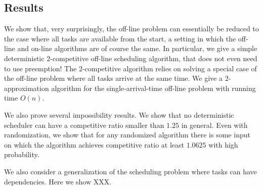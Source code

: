 \subsection{Results}
We show that, very surprisingly, the off-line problem can
essentially be reduced to the case where all tasks are available
from the start, a setting in which the off-line and on-line
algorithms are of course the same. In particular, we give a
simple deterministic $2$-competitive off-line scheduling
algorithm, that does not even need to use preemption! The
$2$-competitive algorithm relies on solving a special case of the
off-line problem where all tasks arrive at the same time. We give
a $2$-approximation algorithm for the single-arrival-time
off-line problem with running time $O(n)$.

We also prove several impossibility results.
We show that no deterministic scheduler can have a
competitive ratio smaller than $1.25$ in general.
Even with randomization, we show that for any randomized
algorithm there is some input on which the algorithm achieves
competitive ratio at least $1.0625$ with high probability.

We also consider a generalization of the scheduling problem where
tasks can have dependencies. Here we show XXX.

